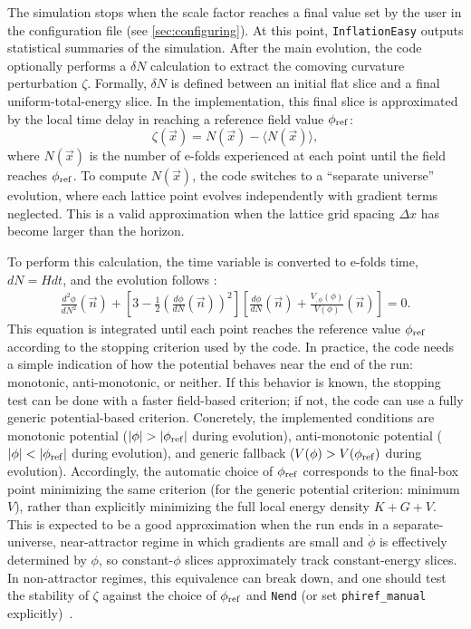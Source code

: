 \documentclass[aps, nofootinbib,superscriptaddress, preprintnumbers, longbibliography]{article}
\begin{document}
The simulation stops when the scale factor reaches a final value set by the user in the configuration file (see \cref{sec:configuring}). At this point, \texttt{InflationEasy} outputs statistical summaries of the simulation. After the main evolution, the code optionally performs a $\delta N$ calculation to extract the comoving curvature perturbation $\zeta$. Formally, $\delta N$ is defined between an initial flat slice and a final uniform-total-energy slice. In the implementation, this final slice is approximated by the local time delay in reaching a reference field value $\phi_{\rm ref}$:
\begin{equation}
\zeta(\vec{x}) = N(\vec{x}) - \langle N(\vec{x}) \rangle,
\end{equation}
where $N(\vec{x})$ is the number of e-folds experienced at each point until the field reaches $\phi_{\rm ref}$. To compute $N(\vec{x})$, the code switches to a ``separate universe'' evolution, where each lattice point evolves independently with gradient terms neglected. This is a valid approximation when the lattice grid spacing $\Delta x$ has become larger than the horizon.

To perform this calculation, the time variable is converted to e-folds time, $dN = H dt$, and the evolution follows \cite{Caravano:2024moy,Caravano:2025diq}:
\begin{align}
\label{eq:eom_deltaN}
\frac{d^2\phi}{dN^2}(\vec{n}) + \left[3 - \frac{1}{2}\left(\frac{d\phi}{dN}(\vec{n})\right)^2 \right]
\left[ \frac{d\phi}{dN}(\vec{n}) + \frac{V_{,\phi}(\phi)}{V(\phi)}(\vec{n}) \right] = 0.
\end{align}
This equation is integrated until each point reaches the reference value $\phi_{\rm ref}$ according to the stopping criterion used by the code. In practice, the code needs a simple indication of how the potential behaves near the end of the run: monotonic, anti-monotonic, or neither. If this behavior is known, the stopping test can be done with a faster field-based criterion; if not, the code can use a fully generic potential-based criterion. Concretely, the implemented conditions are monotonic potential ($|\phi|>|\phi_{\rm ref}|$ during evolution), anti-monotonic potential ($|\phi|<|\phi_{\rm ref}|$ during evolution), and generic fallback ($V(\phi)>V(\phi_{\rm ref})$ during evolution). Accordingly, the automatic choice of $\phi_{\rm ref}$ corresponds to the final-box point minimizing the same criterion (for the generic potential criterion: minimum $V$), rather than explicitly minimizing the full local energy density $K+G+V$. This is expected to be a good approximation when the run ends in a separate-universe, near-attractor regime in which gradients are small and $\dot\phi$ is effectively determined by $\phi$, so constant-$\phi$ slices approximately track constant-energy slices. In non-attractor regimes, this equivalence can break down, and one should test the stability of $\zeta$ against the choice of $\phi_{\rm ref}$ and \texttt{Nend} (or set \texttt{phiref\_manual} explicitly)~\cite{Caravano:2025diq}.
\end{document}
